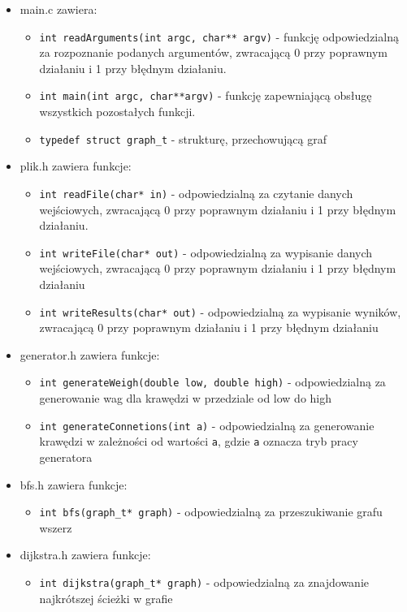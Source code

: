 \documentclass{article}
\begin{document}
\begin {itemize}
\item main.c zawiera:
    \begin {itemize}
    \item \texttt{\footnotesize int readArguments(int argc, char** argv)} - funkcję odpowiedzialną za rozpoznanie podanych argumentów, zwracającą 0 przy poprawnym działaniu i 1 przy błędnym działaniu.
    \item \texttt{\footnotesize int main(int argc, char**argv)} - funkcję zapewniającą obsługę wszystkich pozostałych funkcji.
    \item \texttt{\footnotesize typedef struct graph\_t} - strukturę, przechowującą graf
    \end {itemize}

\item plik.h zawiera funkcje:
    \begin{itemize}
        \item \texttt{\footnotesize int readFile(char* in)} - odpowiedzialną za czytanie danych wejściowych, zwracającą 0 przy poprawnym działaniu i 1 przy błędnym działaniu.
        \item \texttt{\footnotesize int writeFile(char* out)} - odpowiedzialną za wypisanie danych wejściowych, zwracającą 0 przy poprawnym działaniu i 1 przy błędnym działaniu
        \item \texttt{\footnotesize int writeResults(char* out)} - odpowiedzialną za wypisanie wyników, zwracającą 0 przy poprawnym działaniu i 1 przy błędnym działaniu
    \end{itemize}
\item generator.h zawiera funkcje:
    \begin{itemize}
        \item \texttt{\footnotesize int generateWeigh(double low, double high)} - odpowiedzialną za generowanie wag dla krawędzi w przedziale od low do high
        \item \texttt{\footnotesize int generateConnetions(int a)} - odpowiedzialną za generowanie krawędzi w zależności od wartości \texttt{\footnotesize a}, gdzie \texttt{\footnotesize a} oznacza tryb pracy generatora
    \end{itemize}
\item bfs.h zawiera funkcje:
\begin{itemize}
    \item \texttt{\footnotesize int bfs(graph\_t* graph)} - odpowiedzialną za przeszukiwanie grafu wszerz
\end{itemize}
\item dijkstra.h zawiera funkcje:
\begin{itemize}
    \item \texttt{\footnotesize int dijkstra(graph\_t* graph)} - odpowiedzialną za znajdowanie najkrótszej ścieżki w grafie
\end{itemize}
\end{itemize}
\end{document}
